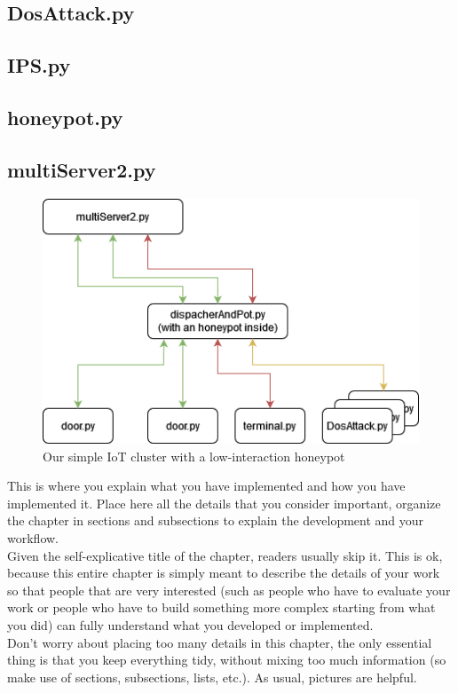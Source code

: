 \subsection{DosAttack.py}

\subsection{IPS.py}

\subsection{honeypot.py}

\subsection{multiServer2.py}


\begin{figure}[h!]
  \centering
  \includegraphics[width = 12cm]{images/lowInterationHoneypot.drawio.png}
  \caption{Our simple IoT cluster with a low-interaction honeypot}
  \label{fig:DosImpl2}
\end{figure}
\FloatBarrier
\noindent







This is where you explain what you have implemented and how you have implemented it. Place here all the details that you consider important, organize the chapter in sections and subsections to explain the development and your workflow.\\Given the self-explicative title of the chapter, readers usually skip it. This is ok, because this entire chapter is simply meant to describe the details of your work so that people that are very interested (such as people who have to evaluate your work or people who have to build something more complex starting from what you did) can fully understand what you developed or implemented.\\Don't worry about placing too many details in this chapter, the only essential thing is that you keep everything tidy, without mixing too much information (so make use of sections, subsections, lists, etc.). As usual, pictures are helpful.